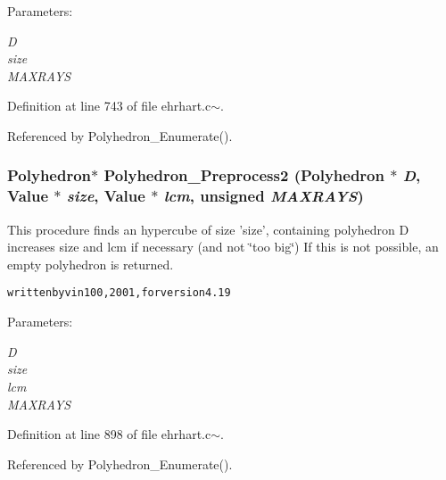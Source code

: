  \begin{Desc}
\item[Parameters: ]\par
\begin{description}
\item[{\em 
D}]\item[{\em 
size}]\item[{\em 
MAXRAYS}]\end{description}
\end{Desc}


Definition at line 743 of file ehrhart.c$\sim$.

Referenced by Polyhedron\_\-Enumerate().

\subsubsection{\setlength{\rightskip}{0pt plus 5cm}Polyhedron$\ast$ Polyhedron\_\-Preprocess2 (Polyhedron $\ast$ {\em D}, Value $\ast$ {\em size}, Value $\ast$ {\em lcm}, unsigned {\em MAXRAYS})}\label{ehrhart_8c~_a21}


This procedure finds an hypercube of size 'size', containing polyhedron D increases size and lcm if necessary (and not \char`\"{}too big\char`\"{}) If this is not possible, an empty polyhedron is returned.





\small\begin{alltt} written by vin100, 2001, for version 4.19\end{alltt}\normalsize 
\begin{Desc}
\item[Parameters: ]\par
\begin{description}
\item[{\em 
D}]\item[{\em 
size}]\item[{\em 
lcm}]\item[{\em 
MAXRAYS}]\end{description}
\end{Desc}


Definition at line 898 of file ehrhart.c$\sim$.

Referenced by Polyhedron\_\-Enumerate().

